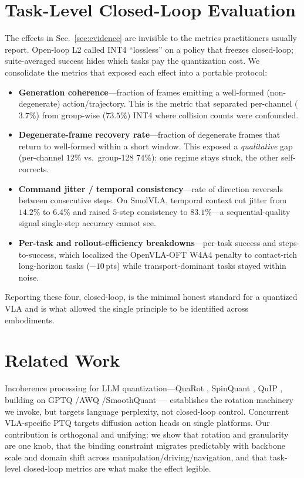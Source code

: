 \documentclass[11pt]{article}
\begin{document}
\section{Task-Level Closed-Loop Evaluation}\label{sec:eval}
The effects in Sec.~\ref{sec:evidence} are invisible to the metrics practitioners usually report.
Open-loop L2 called INT4 ``lossless'' on a policy that freezes closed-loop; suite-averaged success
hides which tasks pay the quantization cost. We consolidate the metrics that exposed each effect into
a portable protocol:
\begin{itemize}
  \item \textbf{Generation coherence}---fraction of frames emitting a well-formed (non-degenerate)
        action/trajectory. This is the metric that separated per-channel ($3.7\%$) from group-wise
        ($73.5\%$) INT4 where collision counts were confounded.
  \item \textbf{Degenerate-frame recovery rate}---fraction of degenerate frames that return to
        well-formed within a short window. This exposed a \emph{qualitative} gap (per-channel $12\%$
        vs.\ group-128 $74\%$): one regime stays stuck, the other self-corrects.
  \item \textbf{Command jitter / temporal consistency}---rate of direction reversals between
        consecutive steps. On SmolVLA, temporal context cut jitter from $14.2\%$ to $6.4\%$ and
        raised $5$-step consistency to $83.1\%$---a sequential-quality signal single-step accuracy
        cannot see.
  \item \textbf{Per-task and rollout-efficiency breakdowns}---per-task success and steps-to-success,
        which localized the OpenVLA-OFT W4A4 penalty to contact-rich long-horizon tasks
        ($-10$\,pts) while transport-dominant tasks stayed within noise.
\end{itemize}
Reporting these four, closed-loop, is the minimal honest standard for a quantized VLA and is what
allowed the single principle to be identified across embodiments.

\section{Related Work}
Incoherence processing for LLM quantization---QuaRot \cite{quarot}, SpinQuant \cite{spinquant},
QuIP \cite{quip}, building on GPTQ \cite{gptq}/AWQ \cite{awq}/SmoothQuant \cite{smoothquant}---
establishes the rotation machinery we invoke, but targets language perplexity, not closed-loop
control. Concurrent VLA-specific PTQ \cite{omegaqvla,dyqvla} targets diffusion action heads on single
platforms. Our contribution is orthogonal and unifying: we show that rotation and granularity are one
knob, that the binding constraint migrates predictably with backbone scale and domain shift across
manipulation/driving/navigation, and that task-level closed-loop metrics are what make the effect
legible.
\end{document}

